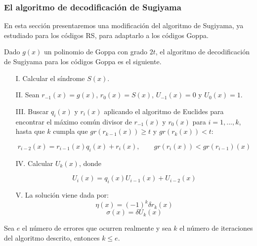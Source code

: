 \subsubsection{El algoritmo de decodificación de Sugiyama}

En esta sección presentaremos una modificación del algoritmo de Sugiyama, ya estudiado para los códigos RS, para adaptarlo a los códigos Goppa.

Dado $g(x)$ un polinomio de Goppa con grado $2t$, el algoritmo de decodificación de Sugiyama para los códigos Goppa es el siguiente.

\begin{itemize}
    \item[I.] Calcular el síndrome $S(x)$.
    \item[II.] Sean $r_{-1}(x) = g(x)$, $r_0(x) = S(x)$, $U_{-1}(x) = 0$ y $U_0(x) = 1$.
    \item[III.] Buscar $q_i(x)$ y $r_i(x)$ aplicando el algoritmo de Euclides para encontrar el máximo común divisor de $r_{-1}(x)$ y $r_0(x)$ para $i = 1,..., k$, hasta que $k$ cumpla que $gr(r_{k-1}(x)) \geq t$ y $gr(r_k(x)) < t$:

        $$r_{i-2}(x) = r_{i-1}(x) q_i(x) + r_i(x), \qquad gr(r_i(x)) < gr(r_{i-1})(x)$$
    
    \item[IV.] Calcular $U_k(x)$, donde
    
        $$U_i(x) = q_i(x) U_{i-1}(x) + U_{i-2}(x)$$

    \item[V.] La solución viene dada por:
        $$\eta(x) = (-1)^k \delta r_k(x)$$
        $$\sigma(x) = \delta U_k(x)$$
\end{itemize}

\begin{proposition}
    Sea $e$ el número de errores que ocurren realmente y sea $k$ el número de iteraciones del algoritmo descrito, entonces $k \leq e$.
\end{proposition}